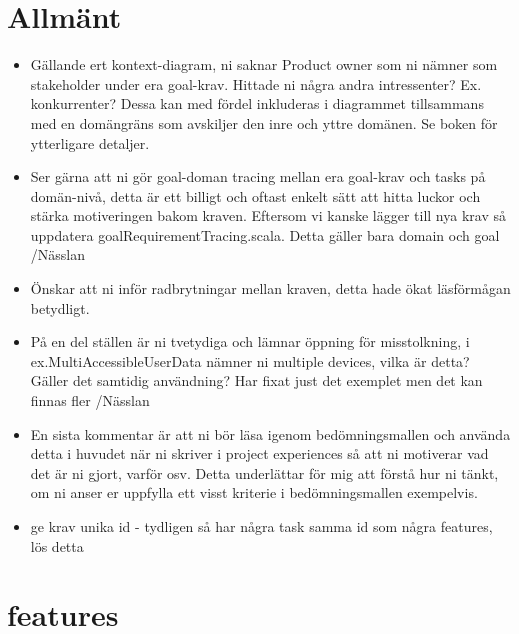 \documentclass[a4paper]{article}
\begin{document}
	\thispagestyle{empty}
	\setcounter{page}{0}
	\pagebreak
	\tableofcontents
	\pagebreak

\section{Allmänt}
\begin{itemize}

	
	\item Gällande ert kontext-diagram, ni saknar Product owner som ni nämner som stakeholder under era goal-krav. Hittade ni några andra intressenter? Ex. konkurrenter? Dessa kan med fördel inkluderas i diagrammet tillsammans med en domängräns som avskiljer den inre och yttre domänen. Se boken för ytterligare detaljer.
	
	\item Ser gärna att ni gör goal-doman tracing mellan era goal-krav och tasks på domän-nivå, detta är ett billigt och oftast enkelt sätt att hitta luckor och stärka motiveringen bakom kraven. Eftersom vi kanske lägger till nya krav så uppdatera goalRequirementTracing.scala. Detta gäller bara domain och goal /Nässlan
	
	\item Önskar att ni inför radbrytningar mellan kraven, detta hade ökat läsförmågan betydligt.
	

	\item På en del ställen är ni tvetydiga och lämnar öppning för misstolkning, i ex.MultiAccessibleUserData nämner ni multiple devices, vilka är detta? Gäller det samtidig användning? Har fixat just det exemplet men det kan finnas fler /Nässlan
	
	
	\item En sista kommentar är att ni bör läsa igenom bedömningsmallen och använda detta i huvudet när ni skriver i project experiences så att ni motiverar vad det är ni gjort, varför osv. Detta underlättar för mig att förstå hur ni tänkt, om ni anser er uppfylla ett visst kriterie i bedömningsmallen exempelvis.
	
	
	\item ge krav unika id - tydligen så har några task samma id som några features, lös detta
	
\end{itemize}


\section{features}

		
\end{document}
